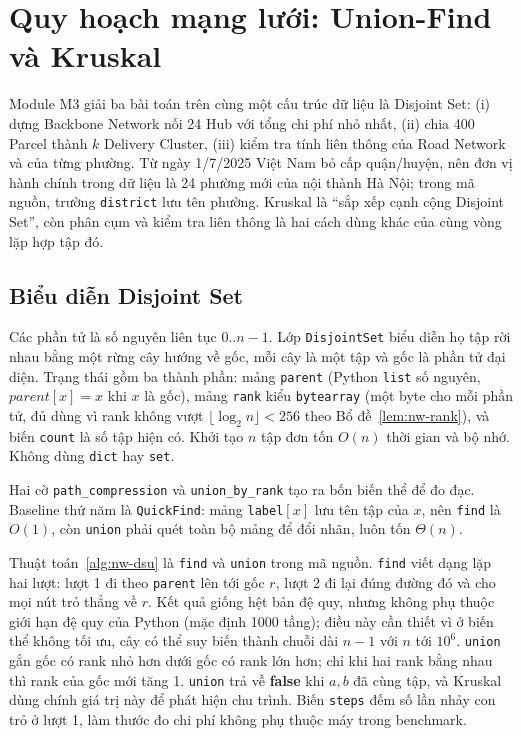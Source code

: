 \section{Quy hoạch mạng lưới: Union-Find và Kruskal}
\label{sec:network}

Module M3 giải ba bài toán trên cùng một cấu trúc dữ liệu là Disjoint Set: (i) dựng Backbone Network nối 24 Hub với tổng chi phí nhỏ nhất, (ii) chia 400 Parcel thành $k$ Delivery Cluster, (iii) kiểm tra tính liên thông của Road Network và của từng phường. Từ ngày 1/7/2025 Việt Nam bỏ cấp quận/huyện, nên đơn vị hành chính trong dữ liệu là 24 phường mới của nội thành Hà Nội; trong mã nguồn, trường \texttt{district} lưu tên phường. Kruskal là ``sắp xếp cạnh cộng Disjoint Set'', còn phân cụm và kiểm tra liên thông là hai cách dùng khác của cùng vòng lặp hợp tập đó.

\subsection{Biểu diễn Disjoint Set}

Các phần tử là số nguyên liên tục $0..n-1$. Lớp \texttt{DisjointSet} biểu diễn họ tập rời nhau bằng một rừng cây hướng về gốc, mỗi cây là một tập và gốc là phần tử đại diện. Trạng thái gồm ba thành phần: mảng \texttt{parent} (Python \texttt{list} số nguyên, $\mathit{parent}[x]=x$ khi $x$ là gốc), mảng \texttt{rank} kiểu \texttt{bytearray} (một byte cho mỗi phần tử, đủ dùng vì rank không vượt $\lfloor\log_2 n\rfloor < 256$ theo Bổ đề~\ref{lem:nw-rank}), và biến \texttt{count} là số tập hiện có. Khởi tạo $n$ tập đơn tốn $O(n)$ thời gian và bộ nhớ. Không dùng \texttt{dict} hay \texttt{set}.

Hai cờ \texttt{path\_compression} và \texttt{union\_by\_rank} tạo ra bốn biến thể để đo đạc. Baseline thứ năm là \texttt{QuickFind}: mảng \texttt{label}$[x]$ lưu tên tập của $x$, nên \texttt{find} là $O(1)$, còn \texttt{union} phải quét toàn bộ mảng để đổi nhãn, luôn tốn $\Theta(n)$.

Thuật toán~\ref{alg:nw-dsu} là \texttt{find} và \texttt{union} trong mã nguồn. \texttt{find} viết dạng lặp hai lượt: lượt 1 đi theo \texttt{parent} lên tới gốc $r$, lượt 2 đi lại đúng đường đó và cho mọi nút trỏ thẳng về $r$. Kết quả giống hệt bản đệ quy, nhưng không phụ thuộc giới hạn đệ quy của Python (mặc định 1000 tầng); điều này cần thiết vì ở biến thể không tối ưu, cây có thể suy biến thành chuỗi dài $n-1$ với $n$ tới $10^6$. \texttt{union} gắn gốc có rank nhỏ hơn dưới gốc có rank lớn hơn; chỉ khi hai rank bằng nhau thì rank của gốc mới tăng 1. \texttt{union} trả về \textbf{false} khi $a, b$ đã cùng tập, và Kruskal dùng chính giá trị này để phát hiện chu trình. Biến \texttt{steps} đếm số lần nhảy con trỏ ở lượt 1, làm thước đo chi phí không phụ thuộc máy trong benchmark.

